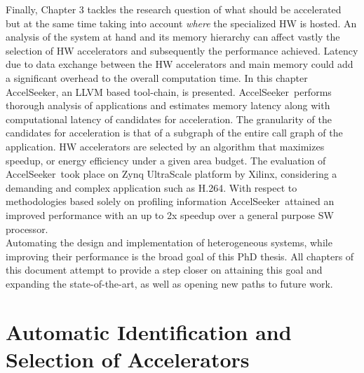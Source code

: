 \documentclass[]{usiinfthesis}
\newcommand{\aseeker}{{AccelSeeker}}
\newcommand{\htsf}{{H.264}}
\newcommand{\SoTA}{{state-of-the-art}}
\begin{document}
Finally, Chapter 3 tackles the research question of what should be accelerated but at the same time
taking into account {\em where} the specialized HW is hosted.
An analysis of the system at hand and its memory hierarchy can affect vastly the selection
of HW accelerators and subsequently the performance achieved. Latency due to data exchange
between the HW accelerators and main memory could add a significant overhead to the overall 
computation time. In this chapter \aseeker, an LLVM based tool-chain, is presented. \aseeker\ 
performs thorough analysis of applications
and estimates memory latency along with computational latency of candidates for acceleration. The 
granularity of the candidates for acceleration is that of a subgraph of the entire call graph of 
the application. 
HW accelerators are selected by an algorithm that maximizes speedup, or energy efficiency 
under a given area budget. The evaluation 
of \aseeker\ took place on Zynq UltraScale platform by Xilinx, considering a demanding and complex 
application such as \htsf. With respect to methodologies based solely on profiling information \aseeker\ 
attained an improved performance with an up to 2x speedup over a general purpose SW processor.\\
Automating the design and implementation of heterogeneous systems, while
improving their performance is the broad goal of this PhD thesis. All chapters of this document 
attempt to provide a step closer on attaining this goal and expanding the \SoTA, as well as opening 
new paths to future work.


%
%
%
%
%  
%
%
%
%
%

\chapter%
{Automatic Identification and Selection of Accelerators}
\end{document}
